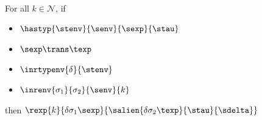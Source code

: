 \begin{theorem} \ \\

  For all $k \in \mathcal{N}$, if
  \begin{itemize}
  \item $\hastyp{\stenv}{\senv}{\sexp}{\stau}$
  \item $\sexp \trans \texp$
  \item $\inrtypenv{\delta}{\stenv}$
  \item $\inrenv {\sigma_1}{\sigma_2}{\senv}{k}$
  \end{itemize}
  then
  $\rexp{k}{\delta\sigma_1\sexp}
  {\salien{\delta\sigma_2\texp}{\stau}{\sdelta}}$
\end{theorem}
